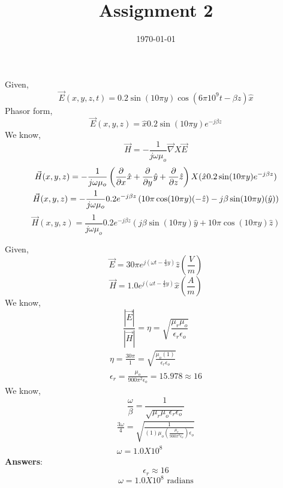 \documentclass[a4paper]{article}
\date{\today}
\title{Assignment 2}
\begin{document}
    \header{}

    \begin{answer}[Question 1]
        Given,
        \[
            \vec{E}(x,y,z,t) = 0.2 \sin (10 \pi y) \cos (6 \pi 10^9 t - \beta z) \hat{x} 
        \]
        Phasor form, 
        \[
            \vec{E}(x,y,z) = \hat{x}  0.2 \sin (10 \pi y) e^{-j \beta z}
        \]
        We know,
        \begin{equation}
            \boxed{\vec{H} = -\frac{1}{j \omega \mu_o}\vec{\nabla}X\vec{E} } 
        \end{equation}
        \begin{gather*}
            \vec{H}(x,y,z) = -\frac{1}{j \omega \mu_o}\left(\pdv{}{x}\hat{x} + \pdv{}{y}\hat{y} + \pdv{}{z}\hat{z} \right) X (\hat{x}  0.2 \sin (10 \pi y) e^{-j \beta z})\\
            \vec{H}(x,y,z) = -\frac{1}{j \omega \mu_o} 0.2 e^{-j \beta z}\left(10\pi \cos (10 \pi y)(-\hat{z})-j\beta\sin(10 \pi y)(\hat{y})\right) 
        \end{gather*}
        \begin{equation}
            \boxed{\vec{H}(x,y,z) = \frac{1}{j \omega \mu_o}0.2 e^{-j \beta z}\left(j\beta \sin(10 \pi y) \hat{y} + 10 \pi \cos(10 \pi y)\hat{z} \right)} 
        \end{equation}
    \end{answer}
    \begin{answer}[Question 2]
        Given,
        \[
            \vec{E} = 30 \pi e^{j(\omega t - \frac{4}{3}y)}\hat{z} (\frac{V}{m})
        \]
        \[
            \vec{H} = 1.0 e^{j(\omega t - \frac{4}{3}y)}\hat{x} (\frac{A}{m}) 
        \]
        We know,
        \begin{equation}
            \boxed{\frac{\left\vert \vec{E} \right\vert }{\left\vert \vec{H} \right\vert } = \eta = \sqrt{ \frac{\mu_r \mu_o}{\epsilon_r \epsilon_o}}}
        \end{equation}
        \begin{gather*}
            \eta = \frac{30 \pi}{1} = \sqrt{\frac{\mu_o (1)}{\epsilon_r \epsilon_o}} \\
            \epsilon_r = \frac{\mu_o}{900 \pi^2 \epsilon_o } = 15.978 \approx 16
        \end{gather*}
        We know,
        \begin{equation}
            \boxed{\frac{\omega}{\beta} = \frac{1}{\sqrt{\mu_r \mu_o \epsilon_r \epsilon_o} }}
        \end{equation}
        \begin{gather*}
            \frac{3 \omega}{4} = \sqrt{ \frac{1}{(1)\mu_o \left(\frac{\mu_o}{900 \pi^2 \epsilon_o } \right)\epsilon_o}} \\
            \omega  = 1.0 X 10^8 
        \end{gather*}
        \textbf{Answers}:
        \[
            \boxed{\epsilon_r \approx 16}
        \]
        \[
            \boxed{\omega = 1.0 X 10^8 \text{  radians} }
        \] 
    \end{answer}
\end{document}
